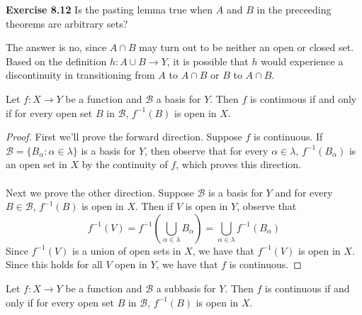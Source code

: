 \documentclass[letter,12pt,twoside]{hmcpset}
\begin{document}
\begin{exercise}[Exercise 8.12]
\textbf{Exercise 8.12} Is the pasting lemma true when $A$ and $B$ in
the preceeding theorems are arbitrary sets?
\end{exercise}

\begin{solution}
The answer is no, since $A \cap B$ may turn out to be neither an open
or closed set. Based on the definition $h : A \cup B \to Y$, it is
possible that $h$ would experience a discontinuity in transitioning
from $A$ to $A \cap B$ or $B$ to $A \cap B$. 
\end{solution}

\begin{problem}[Theorem 8.13] Let $f: X \rightarrow Y$ be a function
and $\mathscr{B}$ a basis for $Y$. Then $f$ is continuous if and only
if for every open set $B$ in $\mathscr{B}$, $f^{-1}(B)$ is open in $X$.
\end{problem}

\begin{proof}
    First we'll prove the forward direction. Suppose $f$ is
    continuous. If $\mathscr{B} = \{B_\alpha : \alpha \in \lambda\}$
    is a basis for $Y$, then observe that for every $\alpha \in
    \lambda$, $f^{-1}(B_\alpha)$ is an open set in $X$ by the
    continuity of $f$, which proves this direction. 
    \\
    \\
    Next we prove the other direction. Suppose $\mathscr{B}$ is a
    basis for $Y$ and for every $B \in \mathscr{B}$, $f^{-1}(B)$ is
    open in $X$. Then if $V$ is open in $Y$, observe that 
    \[
        f^{-1}(V) = f^{-1}(\bigcup\limits_{\alpha \in \lambda} B_\alpha) = 
        \bigcup\limits_{\alpha \in \lambda}f^{-1}(B_\alpha) 
    \]
    Since $f^{-1}(V)$ is a union of open sets in $X$, we have that
    $f^{-1}(V)$ is open in $X$. Since this holds for all $V$ open in
    $Y$, we have that $f$ is continuous.
\end{proof}

\begin{problem}[Theorem 8.14] Let $f: X \rightarrow Y$ be a function
and $\mathscr{B}$ a subbasis for $Y$. Then $f$ is continuous if and only
if for every open set $B$ in $\mathscr{B}$, $f^{-1}(B)$ is open in $X$.
\end{problem}
\end{document}
